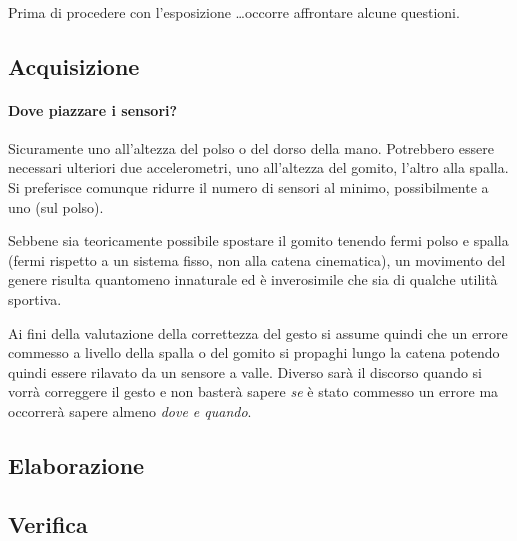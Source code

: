 \vfill \vspace{12pt}

\paragraph{}
Prima di procedere con l'esposizione \dots occorre affrontare alcune questioni.




\vfill
\subsection{Acquisizione}

\paragraph{Dove piazzare i sensori?}
Sicuramente uno all'altezza del polso o del dorso della mano.
Potrebbero essere necessari ulteriori due accelerometri,
uno all'altezza del gomito, l'altro alla spalla.
Si preferisce comunque ridurre il numero di sensori al minimo,
possibilmente a uno (sul polso).

Sebbene sia teoricamente possibile spostare il gomito
tenendo fermi polso e spalla
(fermi rispetto a un sistema fisso, non alla catena cinematica),
un movimento del genere risulta quantomeno innaturale
ed è inverosimile che sia di qualche utilità sportiva.

Ai fini della valutazione della correttezza del gesto
si assume quindi che un errore commesso a livello della spalla
o del gomito si propaghi lungo la catena
potendo quindi essere rilavato da un sensore a valle.
Diverso sarà il discorso quando si vorrà correggere il gesto
e non basterà sapere \emph{se} è stato commesso un errore
ma occorrerà sapere almeno \emph{dove e quando}.


\vfill
\subsection{Elaborazione}






\vfill
\subsection{Verifica}